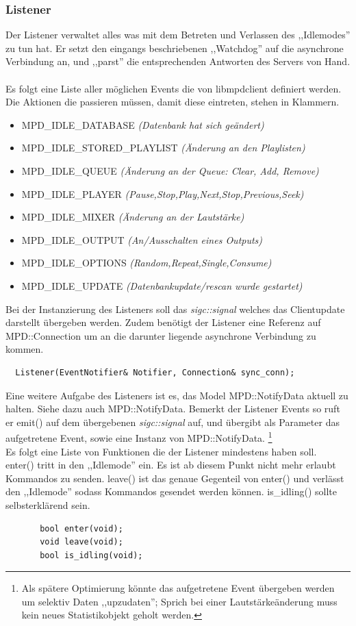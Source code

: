 \subsubsection{Listener}
Der Listener verwaltet alles was mit dem Betreten und Verlassen des ,,Idlemodes''
zu tun hat. Er setzt den eingangs beschriebenen ,,Watchdog'' auf die asynchrone Verbindung an,
und ,,parst'' die entsprechenden Antworten des Servers von Hand. 
\\
\\
Es folgt eine Liste aller möglichen Events die von libmpdclient definiert werden.
Die Aktionen die passieren müssen, damit diese eintreten, stehen in Klammern.
\begin{itemize}
    \item \small MPD\_IDLE\_DATABASE \it(Datenbank hat sich geändert)\rm
    \item \small MPD\_IDLE\_STORED\_PLAYLIST \it(Änderung an den Playlisten)\rm
    \item \small MPD\_IDLE\_QUEUE \it(Änderung an der Queue: Clear, Add, Remove)\rm
    \item \small MPD\_IDLE\_PLAYER \it(Pause,Stop,Play,Next,Stop,Previous,Seek)\rm
    \item \small MPD\_IDLE\_MIXER \it(Änderung an der Lautstärke)\rm
    \item \small MPD\_IDLE\_OUTPUT \it(An/Ausschalten eines Outputs)\rm
    \item \small MPD\_IDLE\_OPTIONS \it(Random,Repeat,Single,Consume)\rm
    \item \small MPD\_IDLE\_UPDATE \it(Datenbankupdate/rescan wurde gestartet)\rm
\end{itemize}
\normalsize
Bei der Instanzierung des Listeners soll das \textit{sigc::signal} welches das Clientupdate darstellt übergeben werden.
Zudem benötigt der Listener eine Referenz auf MPD::Connection um an die darunter liegende asynchrone Verbindung zu kommen.  
\begin{verbatim}
  Listener(EventNotifier& Notifier, Connection& sync_conn);
\end{verbatim}

Eine weitere Aufgabe des Listeners ist es, das Model MPD::NotifyData aktuell zu halten. Siehe dazu auch MPD::NotifyData.
Bemerkt der Listener Events so ruft er emit() auf dem übergebenen \textit{sigc::signal} auf,
und übergibt als Parameter das aufgetretene Event, sowie eine Instanz von MPD::NotifyData.
\footnote{Als spätere Optimierung könnte das aufgetretene Event übergeben werden um selektiv Daten ,,upzudaten''; Sprich bei einer Lautstärkeänderung muss kein neues Statistikobjekt geholt werden.}
\\
Es folgt eine Liste von Funktionen die der Listener mindestens haben soll.
\\
enter() tritt in den ,,Idlemode'' ein. Es ist ab diesem Punkt nicht mehr erlaubt Kommandos zu senden.
leave() ist das genaue Gegenteil von enter() und verlässt den ,,Idlemode'' sodass Kommandos gesendet werden können.  
is\_idling() sollte selbsterklärend sein.
\begin{verbatim}
       bool enter(void);
       void leave(void);
       bool is_idling(void);
\end{verbatim}

